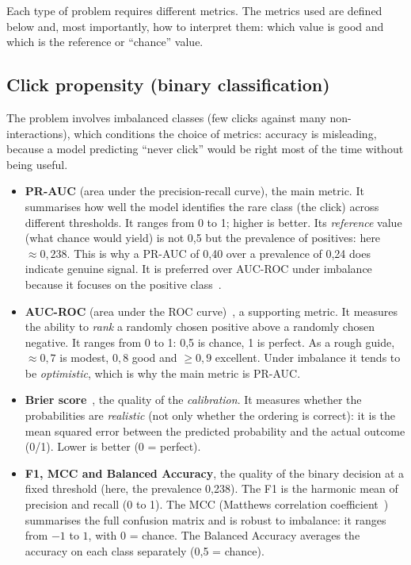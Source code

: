 Each type of problem requires different metrics. The metrics used are defined below and, most importantly, how to interpret them: which value is good and which is the reference or ``chance'' value.

\subsection{Click propensity (binary classification)}

The problem involves imbalanced classes (few clicks against many non-interactions), which conditions the choice of metrics: accuracy is misleading, because a model predicting ``never click'' would be right most of the time without being useful.

\begin{itemize}
    \item \textbf{PR-AUC} (area under the precision-recall curve), the main metric. It summarises how well the model identifies the rare class (the click) across different thresholds. It ranges from 0 to 1; higher is better. Its \emph{reference} value (what chance would yield) is not 0,5 but the prevalence of positives: here $\approx0{,}238$. This is why a PR-AUC of 0,40 over a prevalence of 0,24 does indicate genuine signal. It is preferred over AUC-ROC under imbalance because it focuses on the positive class~\cite{davisgoadrich2006,saito2015}.
    \item \textbf{AUC-ROC} (area under the ROC curve)~\cite{fawcett2006}, a supporting metric. It measures the ability to \emph{rank} a randomly chosen positive above a randomly chosen negative. It ranges from 0 to 1: 0,5 is chance, 1 is perfect. As a rough guide, $\approx0{,}7$ is modest, $0{,}8$ good and $\geq0{,}9$ excellent. Under imbalance it tends to be \emph{optimistic}, which is why the main metric is PR-AUC.
    \item \textbf{Brier score}~\cite{brier1950}, the quality of the \emph{calibration}. It measures whether the probabilities are \emph{realistic} (not only whether the ordering is correct): it is the mean squared error between the predicted probability and the actual outcome (0/1). Lower is better (0 = perfect).
    \item \textbf{F1, MCC and Balanced Accuracy}, the quality of the binary decision at a fixed threshold (here, the prevalence 0,238). The F1 is the harmonic mean of precision and recall (0 to 1). The MCC (Matthews correlation coefficient~\cite{matthews1975}) summarises the full confusion matrix and is robust to imbalance: it ranges from $-1$ to $1$, with 0 = chance. The Balanced Accuracy averages the accuracy on each class separately (0,5 = chance).
\end{itemize}

